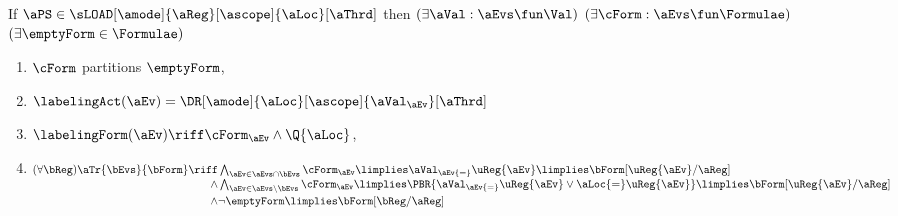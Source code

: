 \begin{definition}
  \medskip
  \noindent
  \begin{minipage}{1.0\linewidth}
  If $\aPS \in \sLOAD[\amode]{\aReg}[\ascope]{\aLoc}[\aThrd]$ then
  $(\exists\aVal:\aEvs\fun\Val)$
  $(\exists\cForm:\aEvs\fun\Formulae)$ 
  $(\exists\emptyForm\in\Formulae)$
  \begin{multicols}{2}
  \begin{enumerate}[topsep=0pt,label=(\textsc{r}\arabic*),ref=\textsc{r}\arabic*]
  \item \label{read-E-ca}
    $\cForm$ partitions $\emptyForm$,
  \item \label{read-lambda-ca}
    $\labelingAct(\aEv) = \DR[\amode]{\aLoc}[\ascope]{\aVal_\aEv}[\aThrd]$
  \item \label{read-kappa-ca}
    \begin{math}
      \labelingForm(\aEv) \riff      
      \cForm_\aEv
      \land\Q{\aLoc}
    \end{math},
  \item \label{read-tau-ca}
    \begin{math}
      \begin{aligned}[t]
        (\forall\bReg)
        \aTr{\bEvs}{\bForm} \riff
        &\textstyle\bigwedge_{\aEv\in\aEvs\cap\bEvs}
        \cForm_\aEv
        \limplies \aVal_\aEv{=}\uReg{\aEv}
        \limplies \bForm[\uReg{\aEv}/\aReg]
        \\[-.5ex]
        \land
        &\textstyle\bigwedge_{\aEv\in\aEvs\setminus\bEvs}
        \cForm_\aEv 
        \limplies
        \PBR{\aVal_\aEv{=}\uReg{\aEv} \lor \aLoc{=}\uReg{\aEv}}
        \limplies
        \bForm[\uReg{\aEv}/\aReg]
        \\[-.5ex]
        \land
        &
        \lnot\emptyForm
        \limplies 
        \bForm[\bReg/\aReg]
      \end{aligned}
    \end{math}
    \columnbreak
      

\end{enumerate}
\end{multicols}
\end{minipage}
\end{definition}
